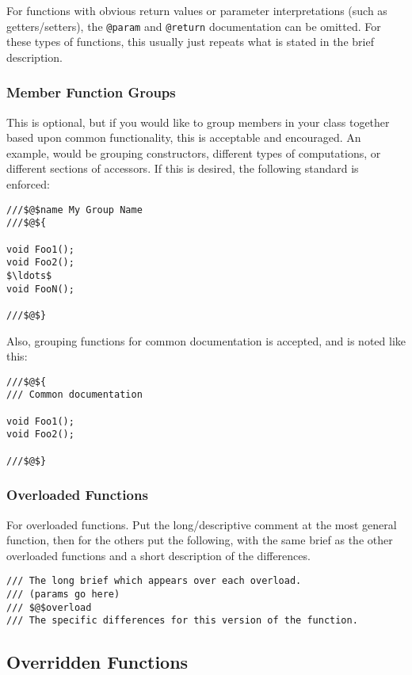 \documentclass[12pt]{article}
\begin{document}
For functions with obvious return values or parameter interpretations (such as
getters/setters), the \texttt{@param} and \texttt{@return} documentation can be
omitted. For these types of functions, this usually just repeats what is stated
in the brief description.

\subsubsection{Member Function Groups}

This is optional, but if you would like to group members in your class together
based upon common functionality, this is acceptable and encouraged. An example,
would be grouping constructors, different types of computations, or different
sections of accessors. If this is desired, the following standard is enforced:

\begin{lstlisting}[mathescape]
///$@$name My Group Name
///$@${

void Foo1();
void Foo2();
$\ldots$
void FooN();

///$@$}
\end{lstlisting}

Also, grouping functions for common documentation is accepted, and is noted like
this:

\begin{lstlisting}[mathescape]
///$@${
/// Common documentation

void Foo1();
void Foo2();

///$@$}
\end{lstlisting}

\subsubsection{Overloaded Functions}

For overloaded functions. Put the long/descriptive comment at the most general
function, then for the others put the following, with the same brief as the
other overloaded functions and a short description of the differences.

\begin{lstlisting}[mathescape]
/// The long brief which appears over each overload.
/// (params go here)
/// $@$overload
/// The specific differences for this version of the function.
\end{lstlisting}

\subsection{Overridden Functions}
\end{document}
